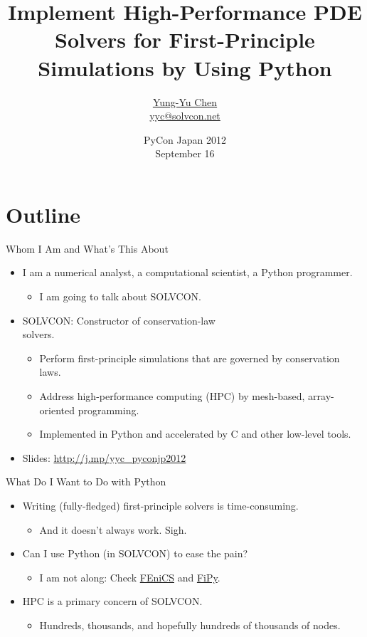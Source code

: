 \documentclass[dvips,xcolor=pst,14pt]{beamer}
\title[SOLVCON: HPC PDE Solvers]{Implement High-Performance PDE Solvers for
First-Principle Simulations by Using Python}
\author[\href{http://solvcon.net/yyc/}{Chen}]%
{\href{http://solvcon.net/yyc/}{Yung-Yu Chen} \\ \url{yyc@solvcon.net}}
\institute[\href{http://solvcon.net/}{SOLVCON}]%
{Developer \\ \href{http://solvcon.net/}{SOLVCON Project}}
\date[2012/9/16]{PyCon Japan 2012 \\ September 16}
\begin{document}
\begin{frame}
\titlepage
\end{frame}

\section*{
Outline
}

\begin{frame}{
%
Whom I Am and What's This About
%
}
\begin{itemize}
  \item I am a numerical analyst, a computational scientist, a Python programmer.
  \begin{itemize}
    \item I am going to talk about \alert{SOLVCON}.
  \end{itemize}
  \item SOLVCON: Constructor of conservation-law \\ solvers.
  \begin{itemize}
    \item Perform first-principle simulations that are governed by conservation
    laws.
    \item Address \alert{high-performance computing (HPC)} by mesh-based,
    array-oriented programming.
    \item Implemented in Python and accelerated by C and other low-level tools.
  \end{itemize}
  \item Slides: \url{http://j.mp/yyc_pyconjp2012}
\end{itemize}
\end{frame}

\begin{frame}{
%
What Do I Want to Do with Python
%
}
\begin{itemize}
  \item Writing (fully-fledged) first-principle solvers is time-consuming.
  \begin{itemize}
    \item And it doesn't always work.  Sigh.
  \end{itemize}
  \item Can I use Python (in SOLVCON) to ease the pain?
  \begin{itemize}
    \item I am not along: Check \href{http://www.fenicsproject.org/}{FEniCS}
    and \href{http://www.ctcms.nist.gov/fipy/}{FiPy}.
  \end{itemize}
  \item \alert{HPC} is a primary concern of SOLVCON.
  \begin{itemize}
    \item Hundreds, thousands, and hopefully hundreds of thousands of nodes.
  \end{itemize}
\end{itemize}
\end{frame}
\end{document}
